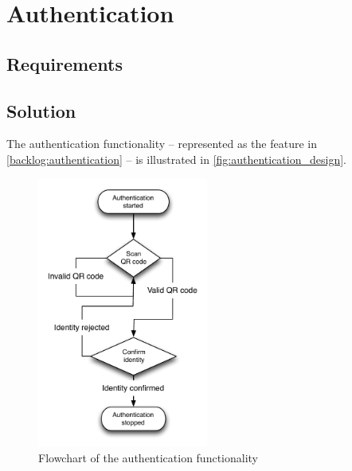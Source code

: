 \section{Authentication}
\label{design:authentication}
\subsection{Requirements}
\label{design:authentication:requirements}

\subsection{Solution}
\label{design:authentication:solution}
The authentication functionality -- represented as the  feature in \autoref{backlog:authentication} -- is illustrated in \autoref{fig:authentication_design}. 
\begin{figure}[h]
	\centering
	\includegraphics[width=0.5\textwidth]{gfx/authentication_design.pdf}
	\caption{Flowchart of the authentication functionality}
	\label{fig:authentication_design}
\end{figure}